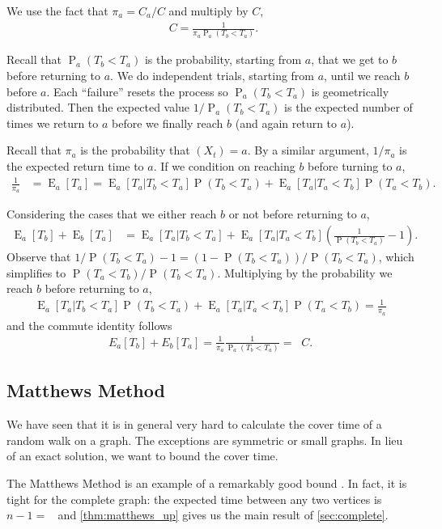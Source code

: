 \documentclass[12pt]{article}
\theoremstyle{definition}
\DeclareMathOperator{\E}{\mathrm{E}}		     %
\DeclareMathOperator{\pr}{\mathrm{P}}		     %
\DeclareMathOperator{\hit}{t_{\textrm{hit}}}     %
\DeclareMathOperator{\Reff}{R_{\textrm{eff}}}    %
\begin{document}
We use the fact that $\pi_a = C_a / C$ and multiply by $C$,
\begin{align}
\Reff C = \frac{1}{\pi_a \pr_a(T_b < T_a)}. \nonumber
\end{align}

Recall that $\pr_a(T_b < T_a)$ is the probability, starting from $a$,
that we get to $b$ before returning to $a$.
We do independent trials, starting from $a$, until we reach $b$ before $a$.
Each ``failure'' resets the process so $\pr_a(T_b < T_a)$ is geometrically distributed.
Then the expected value $1/\pr_a(T_b < T_a)$ is the expected number of times
we return to $a$ before we finally reach $b$ (and again return to $a$).

Recall that $\pi_a$ is the probability that $(X_t) = a$.
By a similar argument, $1/\pi_a$ is the expected return time to $a$.
If we condition on reaching $b$ before turning to $a$,
\begin{align}
\frac{1}{\pi_a} &= \E_a[T_a] =
\E_a[T_a|T_b < T_a] \pr(T_b<T_a) +
\E_a[T_a|T_a < T_b] \pr(T_a<T_b) \nonumber.
\end{align}

Considering the cases that we either reach $b$ or not before
returning to $a$,
\begin{align}
\E_a[T_b] + \E_b[T_a] &= 
\E_a[T_a | T_b < T_a] + 
\E_a[T_a | T_a < T_b] (\frac{1}{\pr(T_b<T_a)} - 1) \nonumber.
\end{align}
Observe that $1/\pr(T_b<T_a)-1 = (1-\pr(T_b<T_a))/\pr(T_b<T_a)$, 
which simplifies to $\pr(T_a<T_b)/\pr(T_b<T_a)$.
Multiplying by the probability we reach $b$ before returning to $a$,
\begin{align}
\E_a[T_a|T_b < T_a] \pr(T_b<T_a) + \E_a[T_a|T_a<T_b] \pr(T_a<T_b)=\frac{1}{\pi_a} \nonumber
\end{align}
and the commute identity follows
\begin{align}
E_a[T_b] + E_b[T_a] = \frac{1}{\pi_a}\frac{1}{\pr_a(T_b < T_a)} = \Reff C.
\label{eqn:commute}
\end{align}

\subsection{Matthews Method}\label{sec:matthews}
We have seen that it is in general very hard
to calculate the cover time of a random walk
on a graph.
The exceptions are symmetric or small graphs.
In lieu of an exact solution, we want to 
bound the cover time.

The Matthews Method is an example of a remarkably good bound \cite{LP17}.
In fact, it is tight for the complete graph:
the expected time between any two vertices
is $n-1 = \hit$ and \cref{thm:matthews_up} gives
us the main result of \cref{sec:complete}.
\end{document}
